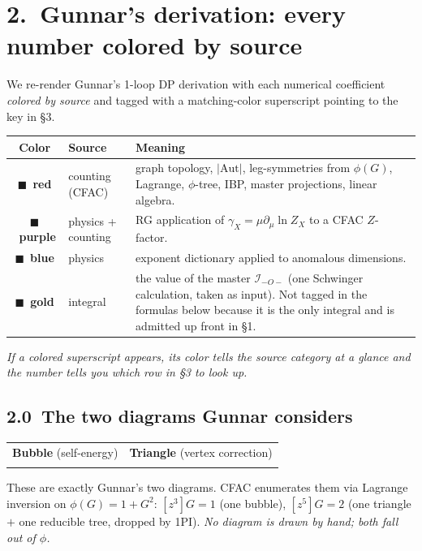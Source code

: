 \documentclass[11pt,a4paper]{article}
\newcommand{\gunnarbubble}{%
\begin{tikzpicture}[baseline=-0.5ex,scale=1.0]
  \draw[thick,-{Stealth[length=2mm]}] (-1.6,0)--(-1.0,0);
  \draw[thick] (-1.0,0)--(-0.6,0);
  \draw[thick] (0,0) circle (0.6);
  \draw[thick] (0.6,0)--(1.0,0);
  \draw[thick,-{Stealth[length=2mm]}] (1.0,0)--(1.6,0);
  \filldraw[black] (-0.6,0) circle (0.07);
  \filldraw[black] ( 0.6,0) circle (0.07);
  \node at (0,0.85) {\scriptsize $\omega+\omega',\ k+k'$};
  \node at (0,-0.85) {\scriptsize $\omega',\ k'$};
  \node[left]  at (-1.6,0) {\scriptsize $\omega,k$};
  \node[right] at ( 1.6,0) {\scriptsize $\omega,k$};
\end{tikzpicture}}
\newcommand{\gunnartriangle}{%
\begin{tikzpicture}[baseline=-0.5ex,scale=1.0]
  \draw[thick,-{Stealth[length=2mm]}] (-1.4,0)--(-0.9,0);
  \draw[thick] (-0.9,0)--(-0.5,0);
  \coordinate (A) at (-0.5,0);
  \coordinate (B) at ( 0.4, 0.5);
  \coordinate (C) at ( 0.4,-0.5);
  \draw[thick] (A) -- (B);
  \draw[thick] (B) -- (C);
  \draw[thick] (C) -- (A);
  \filldraw[black] (A) circle (0.07);
  \filldraw[black] (B) circle (0.07);
  \filldraw[black] (C) circle (0.07);
  \draw[thick] (B) -- (1.0,0.7);
  \draw[thick,-{Stealth[length=2mm]}] (1.0,0.7) -- (1.4,0.85);
  \draw[thick] (C) -- (1.0,-0.7);
  \draw[thick,-{Stealth[length=2mm]}] (1.0,-0.7) -- (1.4,-0.85);
\end{tikzpicture}}
\begin{document}
\section*{2.\ Gunnar's derivation: every number colored by source}

We re-render Gunnar's 1-loop DP derivation with each numerical coefficient \emph{colored
by source} and tagged with a matching-color superscript pointing to the key in \S 3.

\begin{center}
\renewcommand{\arraystretch}{1.15}
\small
\begin{tabular}{@{}c p{4.2cm} p{9.2cm}@{}}
\toprule
\textbf{Color} & \textbf{Source} & \textbf{Meaning} \\
\midrule
\textcolor{cntcol}{$\blacksquare$\ \textbf{red}} &
counting (CFAC) &
graph topology, $|\mathrm{Aut}|$, leg-symmetries from $\phi(G)$, Lagrange, $\phi$-tree, IBP, master projections, linear algebra. \\
\textcolor{mixcol}{$\blacksquare$\ \textbf{purple}} &
physics + counting &
RG application of $\gamma_{X}=\mu\partial_{\mu}\ln Z_{X}$ to a CFAC $Z$-factor. \\
\textcolor{phycol}{$\blacksquare$\ \textbf{blue}} &
physics &
exponent dictionary applied to anomalous dimensions. \\
\textcolor{intcol}{$\blacksquare$\ \textbf{gold}} &
integral &
the value of the master $\mathcal I_{-O-}$ (one Schwinger calculation, taken as input). Not tagged in the formulas below because it is the only integral and is admitted up front in \S 1. \\
\bottomrule
\end{tabular}
\end{center}

\noindent\emph{If a colored superscript appears, its color tells the source category at a
glance and the number tells you which row in \S 3 to look up.}

\subsection*{2.0\ The two diagrams Gunnar considers}

\begin{center}
\begin{tabular}{@{}c@{\hspace{1.5cm}}c@{}}
\textbf{Bubble} (self-energy) & \textbf{Triangle} (vertex correction) \\[4pt]
\gunnarbubble & \gunnartriangle \\
\end{tabular}
\end{center}
\noindent These are exactly Gunnar's two diagrams. CFAC enumerates them via Lagrange
inversion on $\phi(G)=1+G^{2}$: $[z^{3}]G = 1$ (one bubble), $[z^{5}]G = 2$ (one triangle
$+$ one reducible tree, dropped by 1PI). \emph{No diagram is drawn by hand; both fall out
of $\phi$.}
\end{document}
